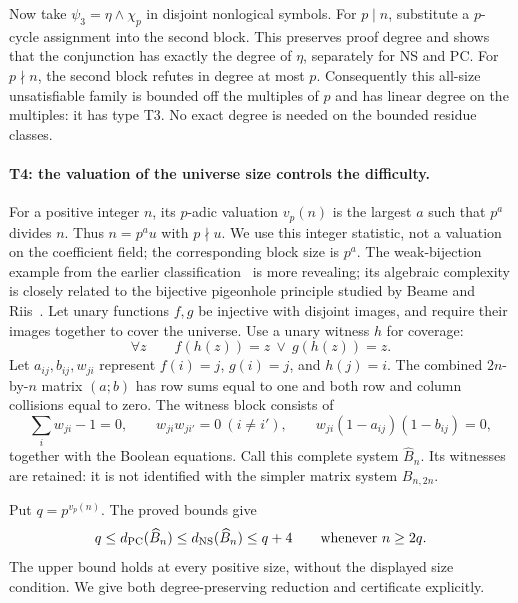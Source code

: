 Now take $\psi_3=\eta\wedge\chi_p$ in disjoint nonlogical symbols.
For $p\mid n$, substitute a $p$-cycle assignment into the second block.
This preserves proof degree and shows that the conjunction has exactly the
degree of $\eta$, separately for NS and PC. For $p\nmid n$, the second
block refutes in degree at most $p$. Consequently this all-size
unsatisfiable family is bounded off the multiples of $p$ and has linear
degree on the multiples: it has type T3. No exact degree is needed on the
bounded residue classes.

\paragraph{T4: the valuation of the universe size controls the difficulty.}
For a positive integer $n$, its $p$-adic valuation $v_p(n)$ is the
largest $a$ such that $p^a$ divides $n$. Thus $n=p^a u$ with
$p\nmid u$. We use this integer statistic, not a valuation on the
coefficient field; the corresponding block size is $p^a$.
The weak-bijection example from the earlier classification~\cite[Section~5]{Riis}
is more revealing; its algebraic complexity is closely related to the
bijective pigeonhole principle studied by Beame and Riis~\cite{BeameRiis}.
Let unary functions $f,g$
be injective with disjoint images, and require their images together to
cover the universe. Use a unary witness $h$ for coverage:
\[
 \forall z\qquad f(h(z))=z\ \vee\ g(h(z))=z.
\]
Let $a_{ij},b_{ij},w_{ji}$ represent $f(i)=j$, $g(i)=j$, and $h(j)=i$.
The combined $2n$-by-$n$ matrix $(a;b)$ has row sums equal to one and both
row and column collisions equal to zero. The witness block consists of
\begin{equation}\label{eq:bhat-witness}
 \sum_iw_{ji}-1=0,\qquad
 w_{ji}w_{ji'}=0\ (i\ne i'),\qquad
 w_{ji}(1-a_{ij})(1-b_{ij})=0,
\end{equation}
together with the Boolean equations. Call this complete system
$\widehat B_n$. Its witnesses are retained: it is not identified with the
simpler matrix system $B_{n,2n}$.

Put $q=p^{v_p(n)}$. The proved bounds give
\begin{equation}\label{eq:bhat-window}
 q\leq d_{\mathrm{PC}}(\widehat B_n)
 \leq d_{\mathrm{NS}}(\widehat B_n)\leq q+4
 \qquad\hbox{whenever } n\geq2q.
\end{equation}
The upper bound holds at every positive size, without the displayed size
condition. We give both degree-preserving reduction and certificate
explicitly.

